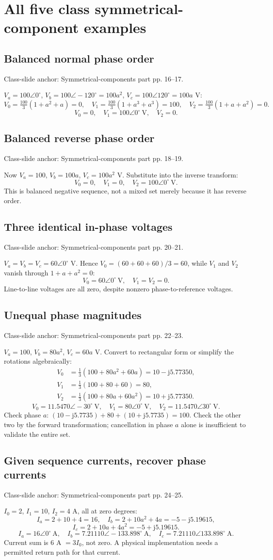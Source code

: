 \documentclass[11pt,a4paper]{article}
\newcommand{\slides}[1]{{\small\color{muted}\textsf{Class-slide anchor: #1.}}\par}
\newcommand{\chapterstart}[2]{\clearpage\section{#1}\label{#2}}
\newcommand{\ans}[1]{\boxed{#1}}
\newcommand{\jj}{\mathrm j}
\begin{document}
\chapterstart{All five class symmetrical-component examples}{sequenceexamples}
\subsection{Balanced normal phase order}
\slides{Symmetrical-components part pp. 16--17}
$V_a=100\angle0^\circ$, $V_b=100\angle-120^\circ=100a^2$, $V_c=100\angle120^\circ=100a$ V:
\[
 V_0=\tfrac{100}{3}(1+a^2+a)=0,\quad
 V_1=\tfrac{100}{3}(1+a^3+a^3)=100,\quad
 V_2=\tfrac{100}{3}(1+a+a^2)=0.
\]
\[
 \ans{V_0=0,\quad V_1=100\angle0^\circ\ \mathrm V,\quad V_2=0}.
\]
\subsection{Balanced reverse phase order}
\slides{Symmetrical-components part pp. 18--19}
Now $V_a=100$, $V_b=100a$, $V_c=100a^2$ V. Substitute into the inverse transform:
\[
 \ans{V_0=0,\quad V_1=0,\quad V_2=100\angle0^\circ\ \mathrm V}.
\]
This is balanced negative sequence, not a mixed set merely because it has reverse order.
\subsection{Three identical in-phase voltages}
\slides{Symmetrical-components part pp. 20--21}
$V_a=V_b=V_c=60\angle0^\circ$ V. Hence $V_0=(60+60+60)/3=60$, while $V_1$ and $V_2$ vanish through $1+a+a^2=0$:
\[
 \ans{V_0=60\angle0^\circ\ \mathrm V,\quad V_1=V_2=0}.
\]
Line-to-line voltages are all zero, despite nonzero phase-to-reference voltages.
\subsection{Unequal phase magnitudes}
\slides{Symmetrical-components part pp. 22--23}
$V_a=100$, $V_b=80a^2$, $V_c=60a$ V. Convert to rectangular form or simplify the rotations algebraically:
\begin{align*}
 V_0&=\tfrac13(100+80a^2+60a)=10-\jj5.77350,\\
 V_1&=\tfrac13(100+80+60)=80,\\
 V_2&=\tfrac13(100+80a+60a^2)=10+\jj5.77350.
\end{align*}
\[
 \ans{V_0=11.5470\angle-30^\circ\ \mathrm V,\quad V_1=80\angle0^\circ\ \mathrm V,
 \quad V_2=11.5470\angle30^\circ\ \mathrm V}.
\]
Check phase $a$: $(10-\jj5.7735)+80+(10+\jj5.7735)=100$. Check the other two by the forward transformation; cancellation in phase $a$ alone is insufficient to validate the entire set.
\subsection{Given sequence currents, recover phase currents}
\slides{Symmetrical-components part pp. 24--25}
$I_0=2$, $I_1=10$, $I_2=4$ A, all at zero degrees:
\[
 I_a=2+10+4=16,\quad I_b=2+10a^2+4a=-5-\jj5.19615,
\]
\[
 I_c=2+10a+4a^2=-5+\jj5.19615.
\]
\[
 \ans{I_a=16\angle0^\circ\ \mathrm A},\quad
 \ans{I_b=7.21110\angle-133.898^\circ\ \mathrm A},\quad
 \ans{I_c=7.21110\angle133.898^\circ\ \mathrm A}.
\]
Current sum is 6 A $=3I_0$, not zero. A physical implementation needs a permitted return path for that current.
\end{document}
